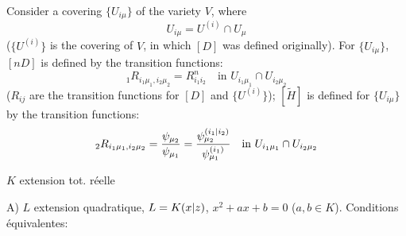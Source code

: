 Consider a covering $\{U_{i\mu}\}$ of the variety $V$, where
\[
U_{i\mu}=U^{(i)}\cap U_\mu
\]
($\{U^{(i)}\}$ is the covering of $V$, in which $[D]$ was defined originally). For $\{U_{i\mu}\}$, $[nD]$ is defined by the transition functions:
\[
{}_1R_{i_1\mu_1,i_2\mu_2}=R^n_{i_1i_2}\quad\text{in }U_{i_1\mu_1}\cap U_{i_2\mu_2}
\]
($R_{ij}$ are the transition functions for $[D]$ and $\{U^{(i)}\}$); $[\widetilde H]$ is defined for $\{U_{i\mu}\}$ by the transition functions:
\[
{}_2R_{i_1\mu_1,i_2\mu_2}=\frac{\psi_{\mu_2}}{\psi_{\mu_1}}=\frac{\psi^{({i_1|i_2})}_{\mu_2}}{\psi^{(i_1)}_{\mu_1}}\quad\text{in }U_{i_1\mu_1}\cap U_{i_2\mu_2}
\]



$K$ extension tot. réelle \margin{[i.e. si $K$ défini par $H\subset\pi_1(Q)$, $H$ ne contient aucun conjugué de $\tau$, $\tau$ la conjugaison ordinaire)}

A) $L$ extension quadratique, $L=K({x|z})$, $x^2+ax+b=0$ ($a,b\in K$).
Conditions équivalentes:

